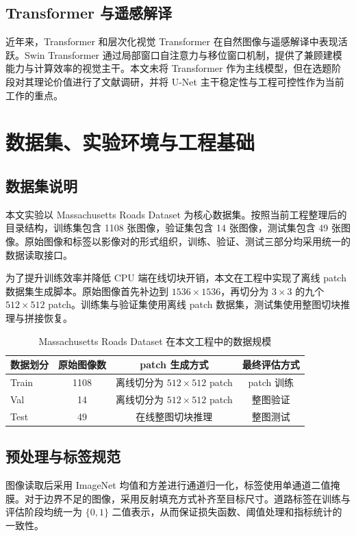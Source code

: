 \documentclass[12pt,a4paper]{ctexart}
\begin{document}
\subsection{Transformer 与遥感解译}
近年来，Transformer 和层次化视觉 Transformer 在自然图像与遥感解译中表现活跃。Swin Transformer 通过局部窗口自注意力与移位窗口机制，提供了兼顾建模能力与计算效率的视觉主干\cite{swin2021}。本文未将 Transformer 作为主线模型，但在选题阶段对其理论价值进行了文献调研，并将 U-Net 主干稳定性与工程可控性作为当前工作的重点。

\section{数据集、实验环境与工程基础}
\subsection{数据集说明}
本文实验以 Massachusetts Roads Dataset 为核心数据集。按照当前工程整理后的目录结构，训练集包含 1108 张图像，验证集包含 14 张图像，测试集包含 49 张图像。原始图像和标签以影像对的形式组织，训练、验证、测试三部分均采用统一的数据读取接口。

为了提升训练效率并降低 CPU 端在线切块开销，本文在工程中实现了离线 patch 数据集生成脚本。原始图像首先补边到 $1536 \times 1536$，再切分为 $3 \times 3$ 的九个 $512 \times 512$ patch。训练集与验证集使用离线 patch 数据集，测试集使用整图切块推理与拼接恢复。

\begin{table}[htbp]
\centering
\caption{Massachusetts Roads Dataset 在本文工程中的数据规模}
\begin{tabular}{lccc}
\toprule
数据划分 & 原始图像数 & patch 生成方式 & 最终评估方式 \\
\midrule
Train & 1108 & 离线切分为 $512 \times 512$ patch & patch 训练 \\
Val & 14 & 离线切分为 $512 \times 512$ patch & 整图验证 \\
Test & 49 & 在线整图切块推理 & 整图测试 \\
\bottomrule
\end{tabular}
\end{table}

\subsection{预处理与标签规范}
图像读取后采用 ImageNet 均值和方差进行通道归一化，标签使用单通道二值掩膜。对于边界不足的图像，采用反射填充方式补齐至目标尺寸。道路标签在训练与评估阶段均统一为 $\{0, 1\}$ 二值表示，从而保证损失函数、阈值处理和指标统计的一致性。
\end{document}
